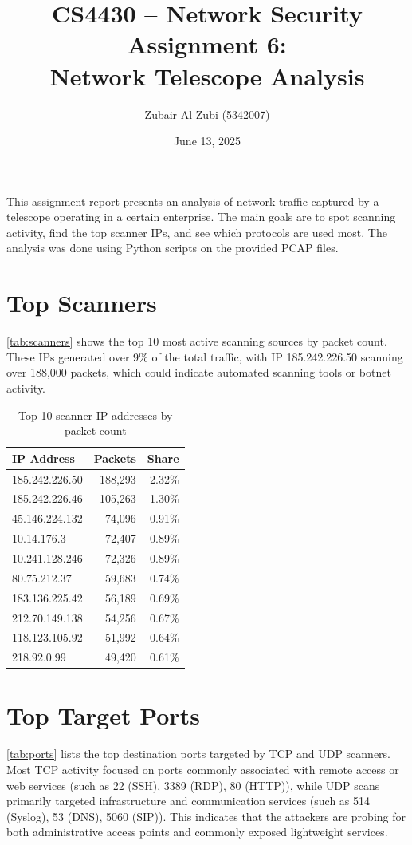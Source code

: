 \documentclass[a4paper,11pt]{article}
\title{\textbf{CS4430 -- Network Security Assignment 6:\\ Network Telescope Analysis}}
\author{Zubair Al-Zubi (5342007)}
\date{June 13, 2025}
\begin{document}
\maketitle
This assignment report presents an analysis of network traffic captured by a telescope operating in a certain enterprise. The main goals are to spot scanning activity, find the top scanner IPs, and see which protocols are used most. The analysis was done using Python scripts on the provided PCAP files.

\section{Top Scanners}
\autoref{tab:scanners} shows the top 10 most active scanning sources by packet count. These IPs generated over 9\% of the total traffic, with IP 185.242.226.50 scanning over 188,000 packets, which could indicate automated scanning tools or botnet activity.

\begin{table}[H]
  \centering
  \begin{tabular}{@{}lrr@{}}
    \toprule
    \textbf{IP Address} & \textbf{Packets} & \textbf{Share} \\
    \midrule
    185.242.226.50      & 188,293          & 2.32\%         \\
    185.242.226.46      & 105,263          & 1.30\%         \\
    45.146.224.132      & 74,096           & 0.91\%         \\
    10.14.176.3         & 72,407           & 0.89\%         \\
    10.241.128.246      & 72,326           & 0.89\%         \\
    80.75.212.37        & 59,683           & 0.74\%         \\
    183.136.225.42      & 56,189           & 0.69\%         \\
    212.70.149.138      & 54,256           & 0.67\%         \\
    118.123.105.92      & 51,992           & 0.64\%         \\
    218.92.0.99         & 49,420           & 0.61\%         \\
    \bottomrule
  \end{tabular}
  \caption{Top 10 scanner IP addresses by packet count}
  \label{tab:scanners}
\end{table}

\section{Top Target Ports}
\autoref{tab:ports} lists the top destination ports targeted by TCP and UDP scanners. Most TCP activity focused on ports commonly associated with remote access or web services (such as 22 (SSH), 3389 (RDP), 80 (HTTP)), while UDP scans primarily targeted infrastructure and communication services (such as 514 (Syslog), 53 (DNS), 5060 (SIP)). This indicates that the attackers are probing for both administrative access points and commonly exposed lightweight services.
\end{document}
